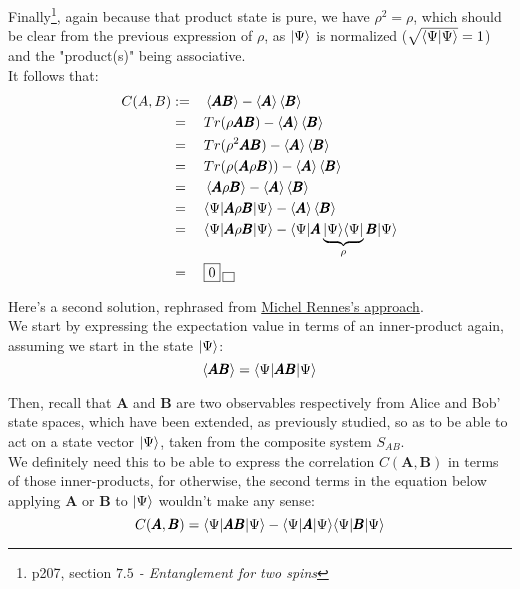 \documentclass[solutions.tex]{subfiles}
\begin{document}
Finally\footnote{p207, section \textit{$7.5$ - Entanglement for two spins}},
again because that product state is pure, we have $\rho^2 = \rho$, which
should be clear from the previous expression of $\rho$, as $|\Psi\rangle$ is
normalized ($\sqrt{\left\langle \Psi \middle| \Psi \right\rangle} = 1$) and the "product(s)" being
associative.\\

It follows that:
\begin{equation*}\begin{aligned}
	C(A, B) &:=&& \left\langle \pmb{AB} \right\rangle - \left\langle \pmb{A} \right\rangle\left\langle \pmb{B} \right\rangle \\
	~ &=&& Tr(\rho \pmb{AB}) - \left\langle \pmb{A} \right\rangle\left\langle \pmb{B} \right\rangle \\
	~ &=&& Tr(\rho^2\pmb{A}\pmb{B}) - \left\langle \pmb{A} \right\rangle\left\langle \pmb{B} \right\rangle \\
	~ &=&& Tr(\rho(\pmb{A}\rho\pmb{B})) - \left\langle \pmb{A} \right\rangle\left\langle \pmb{B} \right\rangle \\
	~ &=&& \left\langle \pmb{A}\rho\pmb{B} \right\rangle - \left\langle \pmb{A} \right\rangle\left\langle \pmb{B} \right\rangle \\
	~ &=&& \langle \Psi|\pmb{A}\rho\pmb{B}|\Psi\rangle
		- \left\langle \pmb{A} \right\rangle\left\langle \pmb{B} \right\rangle \\
	~ &=&& \langle \Psi|\pmb{A}\rho\pmb{B}|\Psi\rangle
		- \langle \Psi|\pmb{A}\underbrace{|\Psi\rangle\langle \Psi|}_{\rho}
			\pmb{B}|\Psi\rangle \\
	~ &=&& \boxed{0} \,\boxed{\,} \\
\end{aligned}\end{equation*}

\hr

Here's a second solution, rephrased from
\href{https://leminimumtheorique.jimdofree.com/le%C3%A7on-7/exercice-7-9/}%
{Michel Rennes's approach}. \\

We start by expressing the expectation value in terms of an inner-product
again, assuming we start in the state $|\Psi\rangle$:
\[
	\left\langle \pmb{AB} \right\rangle = \langle \Psi|\pmb{AB}|\Psi\rangle
\]

Then, recall that $\bm{A}$ and $\bm{B}$ are two observables respectively
from Alice and Bob' state spaces, which have been extended, as previously
studied, so as to be able to act on a state vector $|\Psi\rangle$, taken from
the composite system $S_{AB}$. \\

We definitely need this to be able to express the correlation $C(\bm{A},\bm{B})$
in terms of those inner-products, for otherwise, the second terms in the
equation below applying $\bm{A}$ or $\bm{B}$ to $|\Psi\rangle$ wouldn't
make any sense:
\[
	C(\pmb{A}, \pmb{B}) = \langle \Psi|\pmb{AB}|\Psi\rangle
		- \langle \Psi|\pmb{A}|\Psi\rangle\langle \Psi|\pmb{B}|\Psi\rangle
\]
\end{document}
